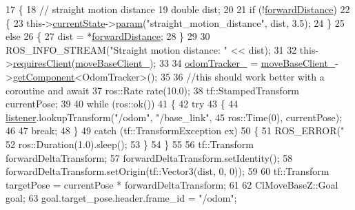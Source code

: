 \begin{DoxyCode}
17 \{
18     \textcolor{comment}{// straight motion distance}
19     \textcolor{keywordtype}{double} dist;
20 
21     \textcolor{keywordflow}{if} (!\hyperlink{classmove__base__z__client_1_1CbNavigateForward_ab3097d686b5a82b4f650bc5175d8ab73}{forwardDistance})
22     \{
23         this->\hyperlink{classsmacc_1_1SmaccClientBehavior_af76fc9b877542ed5caf033f820c107d0}{currentState}->\hyperlink{classsmacc_1_1ISmaccState_a4982f2187ed6da337462721146e8ef70}{param}(\textcolor{stringliteral}{"straight\_motion\_distance"}, dist, 3.5);
24     \}
25     \textcolor{keywordflow}{else}
26     \{
27         dist = *\hyperlink{classmove__base__z__client_1_1CbNavigateForward_ab3097d686b5a82b4f650bc5175d8ab73}{forwardDistance};
28     \}
29 
30     ROS\_INFO\_STREAM(\textcolor{stringliteral}{"Straight motion distance: "} << dist);
31 
32     this->\hyperlink{classsmacc_1_1SmaccClientBehavior_a917f001e763a1059af337bf4e164f542}{requiresClient}(\hyperlink{classmove__base__z__client_1_1CbNavigateForward_ab3b4592cd7f30b490a0549f2ee67c389}{moveBaseClient\_});
33 
34     \hyperlink{classmove__base__z__client_1_1CbNavigateForward_a1472ca04aac37644667e8833668a5bab}{odomTracker\_} = \hyperlink{classmove__base__z__client_1_1CbNavigateForward_ab3b4592cd7f30b490a0549f2ee67c389}{moveBaseClient\_}->\hyperlink{classsmacc_1_1ISmaccClient_adef78db601749ca63c19e74a27cb88cc}{getComponent}<OdomTracker>();
35 
36     \textcolor{comment}{//this should work better with a coroutine and await}
37     ros::Rate rate(10.0);
38     tf::StampedTransform currentPose;
39 
40     \textcolor{keywordflow}{while} (ros::ok())
41     \{
42         \textcolor{keywordflow}{try}
43         \{
44             \hyperlink{classmove__base__z__client_1_1CbNavigateForward_afa40fd805d66eb09e9b4b1bd8356b2a5}{listener}.lookupTransform(\textcolor{stringliteral}{"/odom"}, \textcolor{stringliteral}{"/base\_link"},
45                                      ros::Time(0), currentPose);
46 
47             \textcolor{keywordflow}{break};
48         \}
49         \textcolor{keywordflow}{catch} (tf::TransformException ex)
50         \{
51             ROS\_ERROR(\textcolor{stringliteral}{"%
52             ros::Duration(1.0).sleep();
53         \}
54     \}
55 
56     tf::Transform forwardDeltaTransform;
57     forwardDeltaTransform.setIdentity();
58     forwardDeltaTransform.setOrigin(tf::Vector3(dist, 0, 0));
59 
60     tf::Transform targetPose = currentPose * forwardDeltaTransform;
61 
62     ClMoveBaseZ::Goal goal;
63     goal.target\_pose.header.frame\_id = \textcolor{stringliteral}{"/odom"};
}
\end{DoxyCode}
